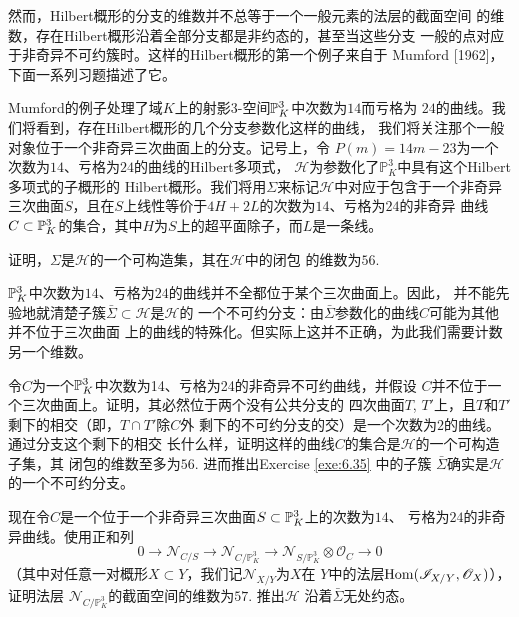 然而，Hilbert概形的分支的维数并不总等于一个一般元素的法层的截面空间
的维数，存在Hilbert概形沿着全部分支都是非约态的，甚至当这些分支
一般的点对应于非奇异不可约簇时。这样的Hilbert概形的第一个例子来自于
Mumford [1962]，下面一系列习题描述了它。

Mumford的例子处理了域$K$上的射影$3$-空间$\P_K^3$中次数为$14$而亏格为
$24$的曲线。我们将看到，存在Hilbert概形的几个分支参数化这样的曲线，
我们将关注那个一般对象位于一个非奇异三次曲面上的分支。记号上，令
$P(m)=14m-23$为一个次数为$14$、亏格为$24$的曲线的Hilbert多项式，
$\mathscr H$为参数化了$\mathbb P_K^3$中具有这个Hilbert多项式的子概形的
Hilbert概形。我们将用$\Sigma$来标记$\mathscr H$中对应于包含于一个非奇异
三次曲面$S$，且在$S$上线性等价于$4H+2L$的次数为$14$、亏格为$24$的非奇异
曲线$C\subset \P_K^3$的集合，其中$H$为$S$上的超平面除子，而$L$是一条线。

\begin{exe}\label{exe:6.35}
证明，$\Sigma$是$\mathscr H$的一个可构造集，其在$\mathscr H$中的闭包
的维数为$56$.
\end{exe}

$\P_K^3$中次数为$14$、亏格为$24$的曲线并不全都位于某个三次曲面上。因此，
并不能先验地就清楚子簇$\bar \Sigma\subset \mathscr H$是$\mathscr H$的
一个不可约分支：由$\bar\Sigma$参数化的曲线$C$可能为其他并不位于三次曲面
上的曲线的特殊化。但实际上这并不正确，为此我们需要计数另一个维数。

\begin{exe}\label{exe:6.36}
令$C$为一个$\P_K^3$中次数为14、亏格为24的非奇异不可约曲线，并假设
$C$并不位于一个三次曲面上。证明，其必然位于两个没有公共分支的
四次曲面$T$, $T'$上，且$T$和$T'$剩下的相交（即，$T\cap T'$除$C$外
剩下的不可约分支的交）是一个次数为$2$的曲线。通过分支这个剩下的相交
长什么样，证明这样的曲线$C$的集合是$\mathscr H$的一个可构造子集，其
闭包的维数至多为$56$. 进而推出Exercise \ref{exe:6.35} 中的子簇
$\bar\Sigma$确实是$\mathscr H$的一个不可约分支。
\end{exe}


\begin{exe}\label{exe:6.37}
现在令$C$是一个位于一个非奇异三次曲面$S\subset \P_K^3$上的次数为$14$、
亏格为$24$的非奇异曲线。使用正和列
\[
    0 \to \mathscr{N}_{C/S} \to \mathscr{N}_{C/\mathbb{P}_{K}^{3}} 
    \to \mathscr{N}_{S/\mathbb{P}_{K}^{3}} \otimes \mathscr{O}_{C} 
    \to 0
\]
（其中对任意一对概形$X\subset Y$，我们记$\mathscr N_{X/Y}$为$X$在
$Y$中的法层$\Hom(\mathscr I_{X/Y},\mathscr O_X)$），证明法层
$\mathscr N_{C/\mathbb P_K^3}$的截面空间的维数为$57$. 推出$\mathscr H$
沿着$\bar\Sigma$无处约态。
\end{exe}

